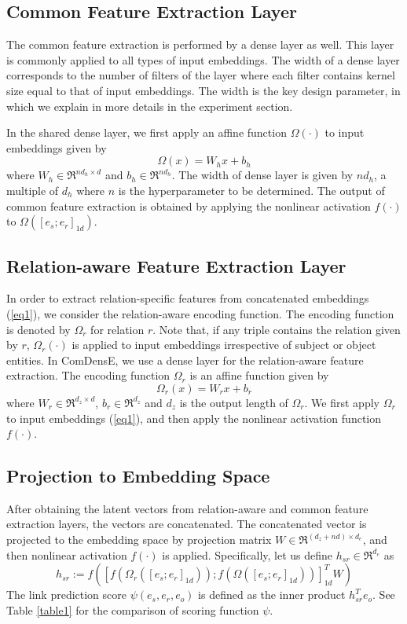 \subsection{Common Feature Extraction Layer}
The common feature extraction is performed by a dense layer as well. This layer is commonly applied to all types of input embeddings. The width of a dense layer corresponds to the number of filters of the layer where each filter contains kernel size equal to that of input embeddings. The width is the key design parameter, in which we explain in more details in the experiment section.  

In the shared dense layer, we first apply an affine function $\Omega(\cdot)$ to input embeddings given by 
\begin{equation}
\Omega(x) = {W_h} x + b_h
\label{eq2}
\end{equation}
where $W_h \in \Re^{n d_h \times d}$ and $b_h \in \Re^{nd_h}$. The width of dense layer is given by $nd_h$, a multiple of $d_h$ where $n$ is the hyperparameter to be determined. The output of common feature extraction is obtained by applying the nonlinear activation $f(\cdot)$ to $\Omega([e_s;e_r]_{1d})$.

\subsection{Relation-aware Feature Extraction Layer}
In order to extract relation-specific features from concatenated embeddings (\ref{eq1}), we consider the relation-aware encoding function. The encoding function is denoted by $\Omega_r$ for relation $r$. Note that, if any triple contains the relation given by $r$, $\Omega_r(\cdot)$ is applied to input embeddings irrespective of subject or object entities. 
In ComDensE, we use a dense layer for the relation-aware feature extraction. The encoding function $\Omega_r$ is an affine function given by
\begin{equation}
\Omega_r(x) = {W_r}x + b_r
\label{eq3}
\end{equation}
where $W_r \in \Re^{d_z\times d } $, $b_r \in \Re^{d_z}$ and $d_z$ is the output length of $\Omega_r$. We first apply $\Omega_r$ to input embeddings (\ref{eq1}), and then apply the nonlinear activation function $f(\cdot)$.

\subsection{Projection to Embedding Space}
After obtaining the latent vectors from relation-aware and common feature extraction layers, the vectors are concatenated. The concatenated vector is projected to the embedding space by projection matrix $W \in \Re^{(d_z+nd) \times d_e}$, and then nonlinear activation $f(\cdot)$ is applied. Specifically, let us define $h_{sr} \in \Re^{d_e}$ as 
\begin{equation}
h_{sr} := f([f(\Omega_r([e_s;e_r]_{1d})); f(\Omega([e_s;e_r]_{1d}))]_{1d}^TW)
\label{eq4}
\end{equation}
The link prediction score $\psi(e_s, e_r, e_o)$ is defined as the inner product $h_{sr}^Te_o$. See Table \ref{table1} for the comparison of scoring function $\psi$. 

